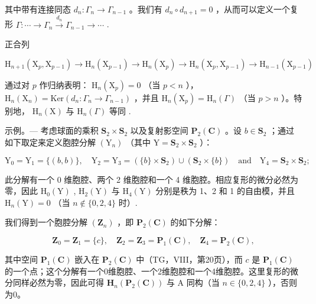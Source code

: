 其中带有连接同态 \(d_{n}:\Gamma_{n}\to\Gamma_{n-1}\) 。我们有 \(d_{n}\circ d_{n+1}=0\) ，从而可以定义一个复形 \(\Gamma:\cdots\to\Gamma_{n}\xrightarrow{d_{n}}\Gamma_{n-1}\to\cdots\) .

正合列

\[
\mathrm{H} _ {n + 1} \left(\mathrm{X} _ {p}, \mathrm{X} _ {p - 1}\right)\rightarrow \mathrm{H} _ {n} \left(\mathrm{X} _ {p - 1}\right)\rightarrow \mathrm{H} _ {n} \left(\mathrm{X} _ {p}\right)\rightarrow \mathrm{H} _ {n} \left(\mathrm{X} _ {p}, \mathrm{X} _ {p - 1}\right)\rightarrow \mathrm{H} _ {n - 1} \left(\mathrm{X} _ {p - 1}\right)
\]

通过对 \(p\) 作归纳表明： \(\mathrm{H}_{n}(\mathrm{X}_{p})=0\) （当 \(p<n\) ）， \(\mathrm{H}_{n}(\mathrm{X}_{n})=\mathrm{Ker}\left(d_{n}:\Gamma_{n}\to\Gamma_{n-1}\right)\) ，并且 \(\mathrm{H}_{n}(\mathrm{X}_{p})=\mathrm{H}_{n}(\Gamma)\) （当 \(p>n\) ）。特别地， \(\mathrm{H}_{n}(\mathrm{X})\) 与 \(\mathrm{H}_{n}(\Gamma)\) 等同 .

示例。--- 考虑球面的乘积 \(\mathbf{S}_{2} \times \mathbf{S}_{2}\) 以及复射影空间 \(\mathbf{P}_{2}(\mathbf{C})\) 。设 \(b \in \mathbf{S}_{2}\) ；通过如下取定来定义胞腔分解 \((\mathrm{Y}_{n})\) （其中 \(\mathrm{Y} = \mathbf{S}_{2} \times \mathbf{S}_{2}\) ）：

\[
\mathrm{Y} _ {0} = \mathrm{Y} _ {1} = \{(b, b) \}, \quad \mathrm{Y} _ {2} = \mathrm{Y} _ {3} = (\{b \} \times \mathbf {S} _ {2}) \cup (\mathbf {S} _ {2} \times \{b \}) \quad \text {and} \quad \mathrm{Y} _ {4} = \mathbf {S} _ {2} \times \mathbf {S} _ {2};
\]

此分解有一个 0 维胞腔、两个 2 维胞腔和一个 4 维胞腔。相应复形的微分必然为零，因此 \(\mathrm{H}_{0}(\mathrm{Y})\) , \(\mathrm{H}_{2}(\mathrm{Y})\) 与 \(\mathrm{H}_{4}(\mathrm{Y})\) 分别是秩为 1、2 和 1 的自由模，并且 \(\mathrm{H}_{n}(\mathrm{Y}) = 0\) （当 \(n \notin \{0, 2, 4\}\) 时）.

我们得到一个胞腔分解 \((\mathbf{Z}_{n})\) ，即 \(\mathbf{P}_{2}(\mathbf{C})\) 的如下分解：

\[
\mathbf {Z} _ {0} = \mathbf {Z} _ {1} = \{c \}, \quad \mathbf {Z} _ {2} = \mathbf {Z} _ {3} = \mathbf {P} _ {1} (\mathbf {C}), \quad \mathbf {Z} _ {4} = \mathbf {P} _ {2} (\mathbf {C}),
\]

其中空间 \(\mathbf{P}_{1}(\mathbf{C})\) 嵌入在 \(\mathbf{P}_{2}(\mathbf{C})\) 中（TG，VIII，第20页），而 \(c\) 是 \(\mathbf{P}_{1}(\mathbf{C})\) 的一个点；这个分解有一个0维胞腔、一个2维胞腔和一个4维胞腔。这里复形的微分同样必然为零，因此可得 \(\mathbf{H}_{n}(\mathbf{P}_{2}(\mathbf{C}))\) 与 A 同构（当 \(n \in \{0, 2, 4\}\) ），否则为0。

